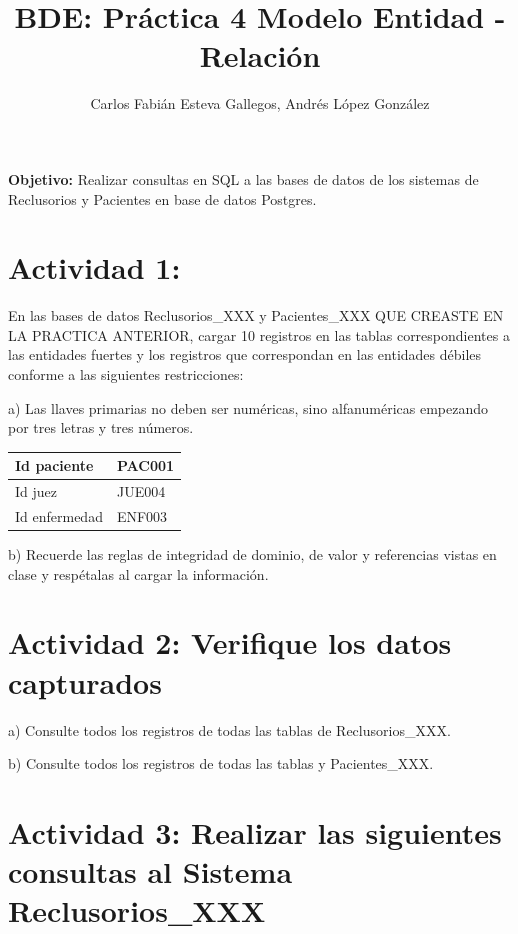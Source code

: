\documentclass{article}
\title{BDE: Práctica   4 Modelo Entidad - Relación}
\author{Carlos Fabián Esteva Gallegos, Andrés López González}
\begin{document}
\maketitle

\textbf{Objetivo:} Realizar consultas en SQL a las bases de datos de los sistemas de Reclusorios y Pacientes en base de datos Postgres.

\section*{Actividad 1:}
En las bases de datos Reclusorios\_XXX y Pacientes\_XXX QUE CREASTE EN LA PRACTICA ANTERIOR, cargar 10 registros en las tablas correspondientes a las entidades fuertes y los registros que correspondan en las entidades débiles conforme a las siguientes restricciones:

a) Las llaves primarias no deben ser numéricas, sino alfanuméricas empezando por tres letras y tres números.

\begin{table}[h]
    \centering
    \begin{tabular}{|l|l|}
        \hline
        Id paciente & PAC001 \\
        \hline
        Id juez & JUE004 \\
        \hline
        Id enfermedad & ENF003 \\
        \hline
    \end{tabular}
\end{table}

b) Recuerde las reglas de integridad de dominio, de valor y referencias vistas en clase y respétalas al cargar la información.



\section*{Actividad 2: Verifique los datos capturados}

a) Consulte todos los registros de todas las tablas de Reclusorios\_XXX.


b) Consulte todos los registros de todas las tablas y Pacientes\_XXX.

\section*{Actividad 3: Realizar las siguientes consultas al Sistema Reclusorios\_XXX}
\end{document}
